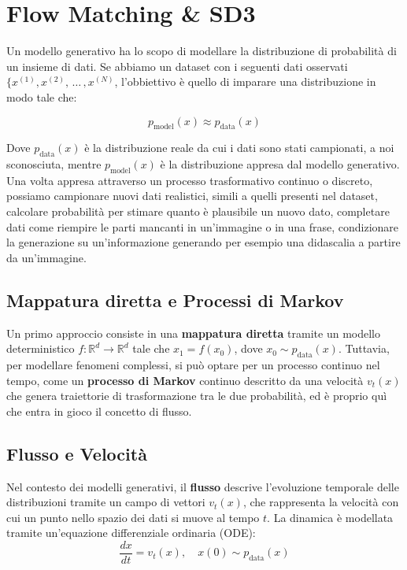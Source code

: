 \chapter{Flow Matching \& SD3}

Un modello generativo ha lo scopo di modellare la distribuzione di probabilità di un insieme di dati. Se abbiamo un dataset con i seguenti dati osservati $\{x^{(1)},x^{(2)},\,\dots\,,x^{(N)}$, l'obbiettivo è quello di imparare una distribuzione in modo tale che:

\begin{equation}
    p_{\operatorname{model}}(x)\approx p_{\operatorname{data}}(x)
\end{equation}

Dove $p_{\operatorname{data}}(x)$ è la distribuzione reale da cui i dati sono stati campionati, a noi sconosciuta, mentre $p_{\operatorname{model}}(x)$ è la distribuzione appresa dal modello generativo. Una volta appresa attraverso un processo trasformativo continuo o discreto, possiamo campionare nuovi dati realistici, simili a quelli presenti nel dataset, calcolare probabilità per stimare quanto è plausibile un nuovo dato, completare dati come riempire le parti mancanti in un'immagine o in una frase, condizionare la generazione su un'informazione generando per esempio una didascalia a partire da un'immagine.

\section{Mappatura diretta e Processi di Markov}
Un primo approccio consiste in una \textbf{mappatura diretta} tramite un modello deterministico $f: \mathbb{R}^d \to \mathbb{R}^d$ tale che $x_1 = f(x_0)$, dove $x_0 \sim p_{\operatorname{data}}(x)$. Tuttavia, per modellare fenomeni complessi, si può optare per un processo continuo nel tempo, come un \textbf{processo di Markov} continuo descritto da una velocità $v_t(x)$ che genera traiettorie di trasformazione tra le due probabilità, ed è proprio quì che entra in gioco il concetto di flusso.

\section{Flusso e Velocità}
Nel contesto dei modelli generativi, il \textbf{flusso} descrive l'evoluzione temporale delle distribuzioni tramite un campo di vettori $v_t(x)$, che rappresenta la velocità con cui un punto nello spazio dei dati si muove al tempo $t$. La dinamica è modellata tramite un'equazione differenziale ordinaria (ODE):
\begin{equation}
    \frac{dx}{dt} = v_t(x), \quad x(0) \sim p_{\operatorname{data}}(x)
\end{equation}

